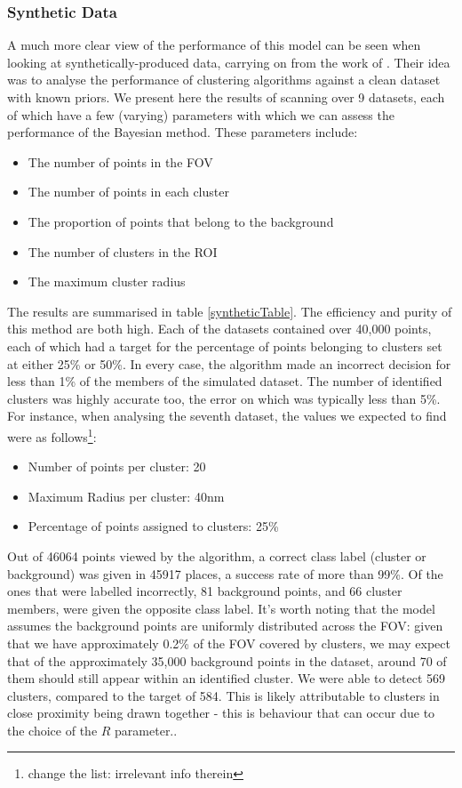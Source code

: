 \documentclass[11pt]{article}
\begin{document}
\subsubsection{Synthetic Data}

A much more clear view of the performance of this model can be seen when looking at synthetically-produced data, carrying on from the work of \cite{williamson2020machine}. Their idea was to analyse the performance of clustering algorithms against a clean dataset with known priors. We present here the results of scanning over 9 datasets, each of which have a few (varying) parameters with which we can assess the performance of the Bayesian method. These parameters include:
\begin{itemize}
	\item The number of points in the FOV
	\item The number of points in each cluster
	\item The proportion of points that belong to the background
	\item The number of clusters in the ROI
	\item The maximum cluster radius
\end{itemize}

The results are summarised in table \ref{syntheticTable}. The efficiency and purity of this method are both high. Each of the datasets contained over 40,000 points, each of which had a target for the percentage of points belonging to clusters set at either 25\% or 50\%. In every case, the algorithm made an incorrect decision for less than 1\% of the members of the simulated dataset. The number of identified clusters was highly accurate too, the error on which was typically less than 5\%. For instance, when analysing the seventh dataset, the values we expected to find were as follows\footnote{change the list: irrelevant info therein}:
\begin{itemize}
	\item Number of points per cluster: 20
	\item Maximum Radius per cluster: 40nm
	\item Percentage of points assigned to clusters: 25\%
\end{itemize}

Out of 46064 points viewed by the algorithm, a correct class label (cluster or background) was given in 45917 places, a success rate of more than 99\%. Of the ones that were labelled incorrectly, 81 background points, and 66 cluster members, were given the opposite class label. It's worth noting that the model assumes the background points are uniformly distributed across the FOV: given that we have approximately 0.2\% of the FOV covered by clusters, we may expect that of the approximately 35,000 background points in the dataset, around 70 of them should still appear within an identified cluster. We were able to detect 569 clusters, compared to the target of 584. This is likely attributable to clusters in close proximity being drawn together - this is behaviour that can occur due to the choice of the $R$ parameter.. \\
\end{document}
